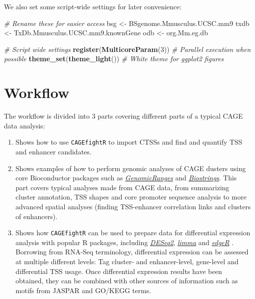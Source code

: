 \documentclass[9pt,a4paper,]{extarticle}
\newenvironment{Shaded}{\begin{snugshade}}{\end{snugshade}}
\newcommand{\KeywordTok}[1]{\textcolor[rgb]{0.13,0.29,0.53}{\textbf{{#1}}}}
\newcommand{\DecValTok}[1]{\textcolor[rgb]{0.00,0.00,0.81}{{#1}}}
\newcommand{\StringTok}[1]{\textcolor[rgb]{0.31,0.60,0.02}{{#1}}}
\newcommand{\CommentTok}[1]{\textcolor[rgb]{0.56,0.35,0.01}{\textit{{#1}}}}
\newcommand{\NormalTok}[1]{{#1}}
\begin{document}
We also set some script-wide settings for later convenience:

\begin{Shaded}
\begin{Highlighting}[]
\CommentTok{# Rename these for easier access}
\NormalTok{bsg <-}\StringTok{ }\NormalTok{BSgenome.Mmusculus.UCSC.mm9}
\NormalTok{txdb <-}\StringTok{ }\NormalTok{TxDb.Mmusculus.UCSC.mm9.knownGene}
\NormalTok{odb <-}\StringTok{ }\NormalTok{org.Mm.eg.db}

\CommentTok{# Script wide settings}
\KeywordTok{register}\NormalTok{(}\KeywordTok{MulticoreParam}\NormalTok{(}\DecValTok{3}\NormalTok{)) }\CommentTok{# Parallel execution when possible}
\KeywordTok{theme_set}\NormalTok{(}\KeywordTok{theme_light}\NormalTok{()) }\CommentTok{# White theme for ggplot2 figures}
\end{Highlighting}
\end{Shaded}

\section{Workflow}\label{workflow}

The workflow is divided into 3 parts covering different parts of a typical CAGE data analysis:

\begin{enumerate}
\def\labelenumi{\arabic{enumi}.}
\item
  Shows how to use \texttt{CAGEfightR} to import CTSSs and find and quantify TSS and enhancer candidates.
\item
  Shows examples of how to perform genomic analyses of CAGE dusters using core Bioconductor packages such as \emph{\href{https://bioconductor.org/packages/3.8/GenomicRanges}{GenomicRanges}} and \emph{\href{https://bioconductor.org/packages/3.8/Biostrings}{Biostrings}}. This part covers typical analyses made from CAGE data, from summarizing cluster annotation, TSS shapes and core promoter sequence analysis to more advanced spatial analyses (finding TSS-enhancer correlation links and clusters of enhancers).
\item
  Shows how \texttt{CAGEfightR} can be used to prepare data for differential expression analysis with popular R packages, including \emph{\href{https://bioconductor.org/packages/3.8/DESeq2}{DESeq2}}, \emph{\href{https://bioconductor.org/packages/3.8/limma}{limma}} and \emph{\href{https://bioconductor.org/packages/3.8/edgeR}{edgeR}} \citep{Love2014, Ritchie2015a, Robinson2010}. Borrowing from RNA-Seq terminology, differential expression can be assessed at multiple different levels: Tag cluster- and enhancer-level, gene-level and differential TSS usage\citep{Soneson2016}. Once differential expression results have been obtained, they can be combined with other sources of information such as motifs from JASPAR \citep{Mathelier2016} and GO/KEGG terms\citep[Hancock2014; Gene2019;][]{Qi2016}.
\end{enumerate}
\end{document}
